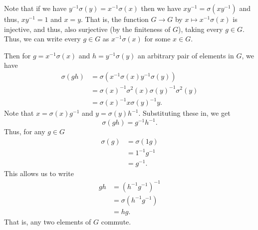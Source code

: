 \documentclass[12 pt, letterpaper]{hmcpset}
\begin{document}
\begin{solution}
	Note that if we have $y^{-1} \sigma(y) = x^{-1} \sigma(x)$ then we have $xy^{-1} = \sigma(xy^{-1})$ and thus, $xy^{-1} = 1$ and $x = y$. That is, the function $G \to G$ by $x \mapsto x^{-1} \sigma(x)$ is injective, and thus, also surjective (by the finiteness of $G$), taking every $g \in G$. Thus, we can write every $g \in G$ as $x^{-1} \sigma(x)$ for some $x \in G$. 

	Then for $g = x^{-1} \sigma(x)$ and $h = y^{-1} \sigma(y)$ an arbitrary pair of elements in $G$, we have
	\[
		\begin{split}
			\sigma(gh) & = \sigma(x^{-1} \sigma(x) y^{-1} \sigma(y)) \\
				   & = \sigma(x)^{-1} \sigma^2(x) \sigma(y)^{-1} \sigma^2(y) \\
				   & = \sigma(x)^{-1} x \sigma(y)^{-1} y.
		\end{split}
	\]
	Note that $x = \sigma(x) g^{-1}$ and $y = \sigma(y) h^{-1}$. Substituting these in, we get
	\[
		\sigma(gh) = g^{-1} h^{-1}.
	\]
	Thus, for any $g \in G$
	\[
		\begin{split}
			\sigma(g) & = \sigma(1 g) \\
				  & = 1^{-1} g^{-1} \\
				  & = g^{-1}.
		\end{split}
	\]
	This allows us to write
	\[
		\begin{split}
			gh & = (h^{-1} g^{-1})^{-1} \\
			   & = \sigma(h^{-1} g^{-1}) \\
			   & = hg.
		\end{split}
	\]
	That is, any two elements of $G$ commute.
\end{solution}
\end{document}
